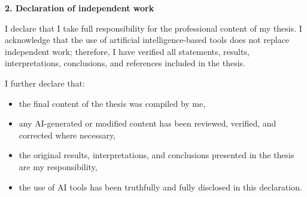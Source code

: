 \medskip
\noindent\textbf{2. Declaration of independent work}

I declare that I take full responsibility for the professional content of my thesis. I acknowledge that the use
of artificial intelligence-based tools does not replace independent work; therefore, I have verified all
statements, results, interpretations, conclusions, and references included in the thesis.

I further declare that:
\begin{itemize}\setlength{\itemsep}{0pt}\setlength{\parskip}{0pt}
  \item the final content of the thesis was compiled by me,
  \item any AI-generated or modified content has been reviewed, verified, and corrected where necessary,
  \item the original results, interpretations, and conclusions presented in the thesis are my responsibility,
  \item the use of AI tools has been truthfully and fully disclosed in this declaration.
\end{itemize}
